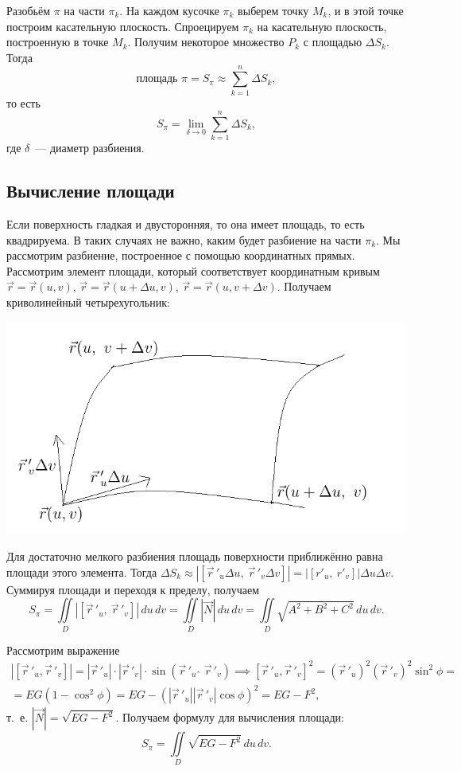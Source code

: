 \documentclass[../../main.tex]{subfiles}
\begin{document}
Разобьём $\pi$ на части $\pi_k$. На каждом кусочке $\pi_k$
выберем точку $M_k$, и в этой точке построим касательную 
плоскость. Спроецируем $\pi_k$ на касательную плоскость, построенную в точке 
$M_k$. Получим некоторое 
множество $P_k$ с площадью $\Delta S_k$. Тогда \[\text{площадь  } \pi = S_\pi 
\approx \sum\limits_{k=1}^n\Delta S_k,\] то есть \[S_\pi = 
\lim\limits_{\delta\rightarrow0}\sum\limits_{k = 1}^n\Delta S_k,\]
где $\delta$~--- диаметр разбиения. 

\subsection{Вычисление площади}

Если поверхность гладкая и двусторонняя, то она имеет площадь, то есть 
квадрируема. В таких случаях не важно, каким будет разбиение на части $\pi_k$. 
Мы рассмотрим разбиение, построенное с помощью координатных прямых. Рассмотрим 
элемент площади, который соответствует координатным кривым
$\vec{r} = \vec{r}(u, v)$, $\vec{r} = 
\vec{r}(u + \Delta u, v)$, $\vec{r} = \vec{r}(u, v + \Delta v)$. Получаем 
криволинейный четырехугольник:

\begin{center}
\includegraphics[scale = 1]{lec22_2.png}
\end{center}

Для достаточно мелкого разбиения площадь поверхности приближённо равна площади 
этого элемента. Тогда $\Delta S_k \approx \left|\left[\vec r\,'_u\Delta u, \ 
\vec r\,'_v\Delta v\right]\right| = \left|\left[r'_u, \ 
r'_v\right]\right|\Delta u\Delta v$. 
Суммируя площади и переходя к пределу, получаем
\[S_\pi = \iint\limits_D\left|\left[\vec r\,'_u, \ \vec 
r\,'_v\right]\right|\,du\,dv = \iint\limits_D|\vec{N}|\,du\,dv = 
\iint\limits_D\sqrt{A^2+B^2+C^2}\,du\,dv.\]

Рассмотрим выражение
\begin{gather*}
\left|\left[\vec r\,'_u, \vec r\,'_v\right]\right| = 
\left|\vec r\,'_u\right|\cdot\left|\vec r\,'_v\right| 
\cdot \sin(\vec r\,'_u \ \hat{\ }\  \vec r\,'_v) \implies
\left[\vec r\,'_u, \vec r\,'_v\right]^2 =
(\vec r\,'_u)^2(\vec r\,'_v)^2\sin^2\phi = \\ = EG(1 
- \cos^2\phi) = EG - (|\vec r\,'_u||\vec r\,'_v|\cos\phi)^2 = EG-F^2,
\end{gather*}
т.~е. $|\vec{N}| = \sqrt{EG - F^2}$. Получаем формулу для вычисления площади:
\[
S_\pi = \iint\limits_D\sqrt{EG - F^2}\,du\,dv.
\]
\end{document}
